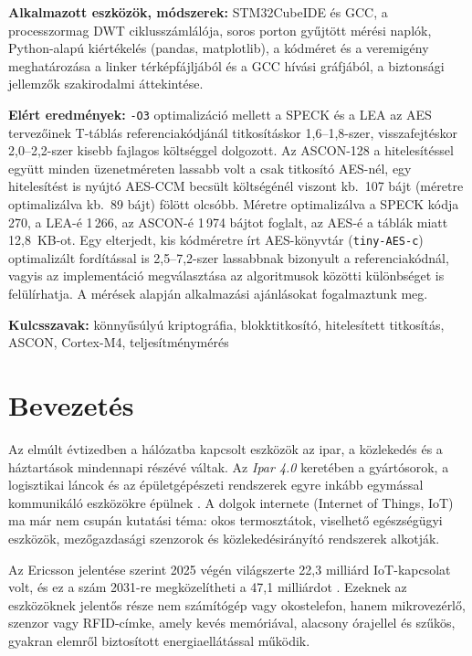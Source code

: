 \documentclass[a4paper,12pt]{report}
\theoremstyle{definition}
\theoremstyle{remark}
\begin{document}
\smallskip
\noindent\textbf{Alkalmazott eszközök, módszerek:} STM32CubeIDE és GCC, a processzormag DWT ciklusszámlálója, soros porton gyűjtött mérési naplók, Python-alapú kiértékelés (pandas, matplotlib), a kódméret és a veremigény meghatározása a linker térképfájljából és a GCC hívási gráfjából, a biztonsági jellemzők szakirodalmi áttekintése.

\smallskip
\noindent\textbf{Elért eredmények:} \texttt{-O3} optimalizáció mellett a SPECK és a LEA az AES tervezőinek T-táblás referenciakódjánál titkosításkor 1,6--1,8-szer, visszafejtéskor 2,0--2,2-szer kisebb fajlagos költséggel dolgozott. Az ASCON-128 a hitelesítéssel együtt minden üzenetméreten lassabb volt a csak titkosító AES-nél, egy hitelesítést is nyújtó AES-CCM becsült költségénél viszont kb.\ 107 bájt (méretre optimalizálva kb.\ 89 bájt) fölött olcsóbb. Méretre optimalizálva a SPECK kódja 270, a LEA-é 1\,266, az ASCON-é 1\,974 bájtot foglalt, az AES-é a táblák miatt 12,8~KB-ot. Egy elterjedt, kis kódméretre írt AES-könyvtár (\texttt{tiny-AES-c}) optimalizált fordítással is 2,5--7,2-szer lassabbnak bizonyult a referenciakódnál, vagyis az implementáció megválasztása az algoritmusok közötti különbséget is felülírhatja. A mérések alapján alkalmazási ajánlásokat fogalmaztunk meg.

\smallskip
\noindent\textbf{Kulcsszavak:} könnyűsúlyú kriptográfia, blokktitkosító, hitelesített titkosítás, ASCON, Cortex-M4, teljesítménymérés

\begingroup
\singlespacing   %
\tableofcontents
\endgroup

\chapter{Bevezetés}

Az elmúlt évtizedben a hálózatba kapcsolt eszközök az ipar, a közlekedés és a háztartások mindennapi részévé váltak. Az \emph{Ipar 4.0} keretében a gyártósorok, a logisztikai láncok és az épületgépészeti rendszerek egyre inkább egymással kommunikáló eszközökre épülnek \cite{Sadeghi2015}. A dolgok internete (Internet of Things, IoT) ma már nem csupán kutatási téma: okos termosztátok, viselhető egészségügyi eszközök, mezőgazdasági szenzorok és közlekedésirányító rendszerek alkotják.

Az Ericsson jelentése szerint 2025 végén világszerte 22,3 milliárd IoT-kapcsolat volt, és ez a szám 2031-re megközelítheti a 47,1 milliárdot \cite{Ericsson2026}. Ezeknek az eszközöknek jelentős része nem számítógép vagy okostelefon, hanem mikrovezérlő, szenzor vagy RFID-címke, amely kevés memóriával, alacsony órajellel és szűkös, gyakran elemről biztosított energiaellátással működik.
\end{document}
